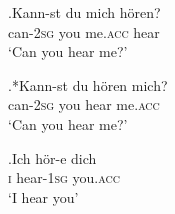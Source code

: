 \documentclass{article}
\begin{document}
\exg.Kann-st du mich h\"{o}ren?\\
can-\textsc{2sg} you me.\textsc{acc} hear\\
`Can you hear me?'

\exg.*Kann-st du h\"{o}ren mich?\\
can-\textsc{2sg} you hear me.\textsc{acc}\\
`Can you hear me?'

\exg.Ich h\"{o}r-e dich\\
\textsc{i} hear-\textsc{1sg} you.\textsc{acc}\\
`I hear you'
\end{document}
